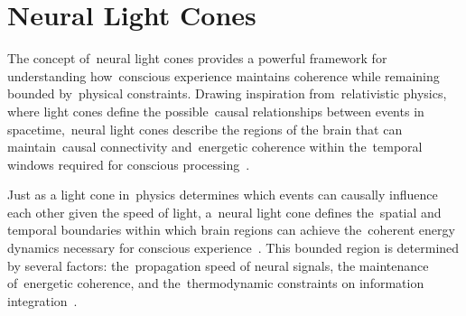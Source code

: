 \section{Neural Light Cones~}

The concept of~neural light cones provides a powerful framework for understanding how~conscious experience maintains coherence while remaining bounded by~physical constraints. Drawing inspiration from~relativistic physics, where light cones define the possible~causal relationships between events in spacetime,~neural light cones describe the regions of the brain that can maintain~causal connectivity and~energetic coherence within the~temporal windows required for conscious processing~\cite{zheng2025unbearable, van2025processes}.

Just as a light cone in~physics determines which events can causally influence each other given the speed of light, a~neural light cone defines the~spatial and temporal boundaries within which brain regions can achieve the~coherent energy dynamics necessary for conscious experience~\cite{frankel2011}. This bounded region is determined by several factors: the~propagation speed of neural signals, the maintenance of~energetic coherence, and the~thermodynamic constraints on information integration~\cite{attwell2001, parrondo2015}.

